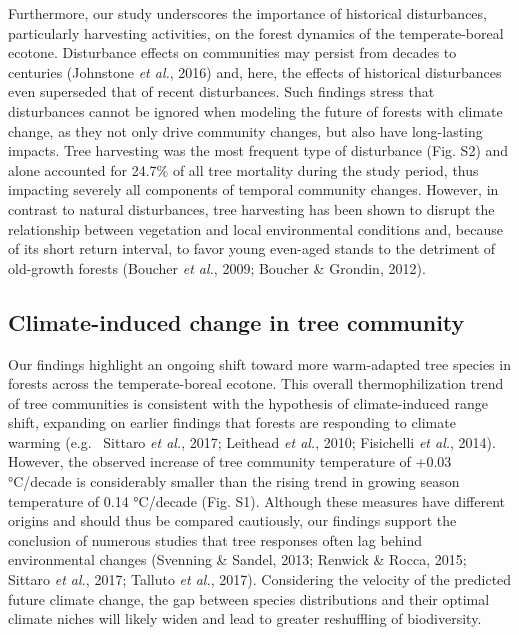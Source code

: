 \documentclass[a4paperpaper,]{article}
\begin{document}
Furthermore, our study underscores the importance of historical
disturbances, particularly harvesting activities, on the forest dynamics
of the temperate-boreal ecotone. Disturbance effects on communities may
persist from decades to centuries (Johnstone \emph{et al.}, 2016) and,
here, the effects of historical disturbances even superseded that of
recent disturbances. Such findings stress that disturbances cannot be
ignored when modeling the future of forests with climate change, as they
not only drive community changes, but also have long-lasting impacts.
Tree harvesting was the most frequent type of disturbance (Fig. S2) and
alone accounted for 24.7\% of all tree mortality during the study
period, thus impacting severely all components of temporal community
changes. However, in contrast to natural disturbances, tree harvesting
has been shown to disrupt the relationship between vegetation and local
environmental conditions and, because of its short return interval, to
favor young even-aged stands to the detriment of old-growth forests
(Boucher \emph{et al.}, 2009; Boucher \& Grondin, 2012).

\hypertarget{climate-induced-change-in-tree-community}{%
\subsection{Climate-induced change in tree
community}\label{climate-induced-change-in-tree-community}}

Our findings highlight an ongoing shift toward more warm-adapted tree
species in forests across the temperate-boreal ecotone. This overall
thermophilization trend of tree communities is consistent with the
hypothesis of climate-induced range shift, expanding on earlier findings
that forests are responding to climate warming (e.g.~ Sittaro \emph{et
al.}, 2017; Leithead \emph{et al.}, 2010; Fisichelli \emph{et al.},
2014). However, the observed increase of tree community temperature of
+0.03 °C/decade is considerably smaller than the rising trend in growing
season temperature of 0.14 °C/decade (Fig. S1). Although these measures
have different origins and should thus be compared cautiously, our
findings support the conclusion of numerous studies that tree responses
often lag behind environmental changes (Svenning \& Sandel, 2013;
Renwick \& Rocca, 2015; Sittaro \emph{et al.}, 2017; Talluto \emph{et
al.}, 2017). Considering the velocity of the predicted future climate
change, the gap between species distributions and their optimal climate
niches will likely widen and lead to greater reshuffling of
biodiversity.
\end{document}
